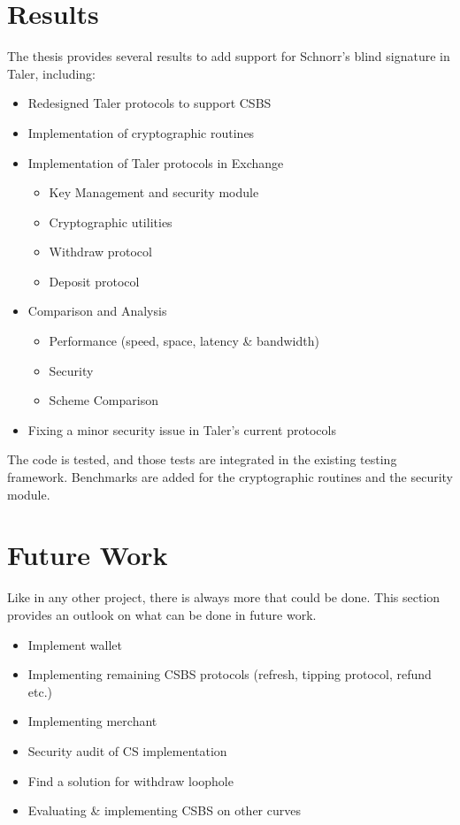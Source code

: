 \section{Results}
The thesis provides several results to add support for Schnorr's blind signature in Taler, including:
\begin{itemize}
    \item Redesigned Taler protocols to support \gls{CSBS}
    \item Implementation of cryptographic routines
    \item Implementation of Taler protocols in Exchange
    \begin{itemize}
        \item Key Management and security module
        \item Cryptographic utilities
        \item Withdraw protocol
        \item Deposit protocol
    \end{itemize}
    \item Comparison and Analysis
    \begin{itemize}
        \item Performance (speed, space, latency \& bandwidth)
        \item Security
        \item Scheme Comparison
    \end{itemize}
    \item Fixing a minor security issue in Taler's current protocols
\end{itemize}
The code is tested, and those tests are integrated in the existing testing framework.
Benchmarks are added for the cryptographic routines and the security module.

\section{Future Work}
Like in any other project, there is always more that could be done.
This section provides an outlook on what can be done in future work.

\begin{itemize}
    \item Implement wallet
    \item Implementing remaining \gls{CSBS} protocols (refresh, tipping protocol, refund etc.)
    \item Implementing merchant
    \item Security audit of CS implementation
    \item Find a solution for withdraw loophole
    \item Evaluating \& implementing \gls{CSBS} on other curves
\end{itemize}

